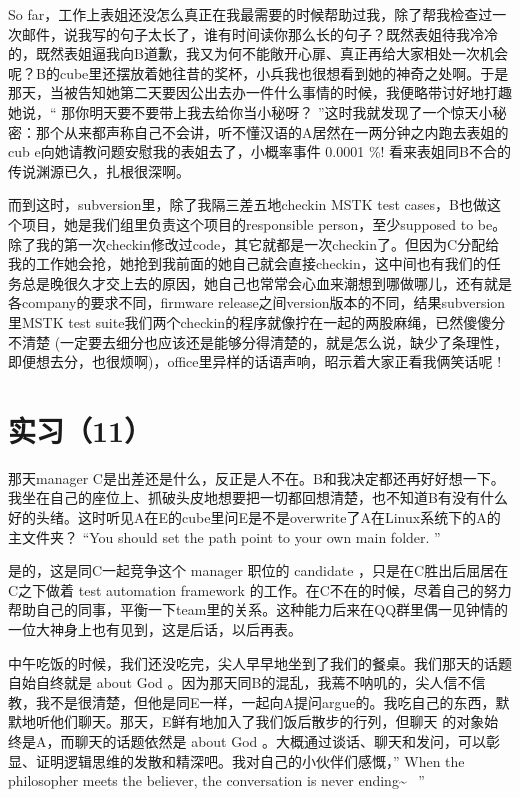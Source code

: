 \documentclass[12pt]{book}
\begin{document}
So far，工作上表姐还没怎么真正在我最需要的时候帮助过我，除了帮我检查过一次邮件，说我写的句子太长了，谁有时间读你那么长的句子？既然表姐待我冷冷的，既然表姐逼我向B道歉，我又为何不能敞开心扉、真正再给大家相处一次机会呢？B的cube里还摆放着她往昔的奖杯，小兵我也很想看到她的神奇之处啊。于是那天，当被告知她第二天要因公出去办一件什么事情的时候，我便略带讨好地打趣她说，“ 那你明天要不要带上我去给你当小秘呀？ ”这时我就发现了一个惊天小秘密：那个从来都声称自己不会讲，听不懂汉语的A居然在一两分钟之内跑去表姐的cub e向她请教问题安慰我的表姐去了，小概率事件 0.0001 \%! 看来表姐同B不合的传说渊源已久，扎根很深啊。

而到这时，subversion里，除了我隔三差五地checkin MSTK test cases，B也做这个项目，她是我们组里负责这个项目的responsible person，至少supposed to be。除了我的第一次checkin修改过code，其它就都是一次checkin了。但因为C分配给我的工作她会抢，她抢到我前面的她自己就会直接checkin，这中间也有我们的任务总是晚很久才交上去的原因，她自己也常常会心血来潮想到哪做哪儿，还有就是各company的要求不同，firmware release之间version版本的不同，结果subversion里MSTK test suite我们两个checkin的程序就像拧在一起的两股麻绳，已然傻傻分不清楚 (一定要去细分也应该还是能够分得清楚的，就是怎么说，缺少了条理性，即便想去分，也很烦啊)，office里异样的话语声响，昭示着大家正看我俩笑话呢 !

\section{实习（11）}
\label{sec-5-14}
那天manager C是出差还是什么，反正是人不在。B和我决定都还再好好想一下。我坐在自己的座位上、抓破头皮地想要把一切都回想清楚，也不知道B有没有什么好的头绪。这时听见A在E的cube里问E是不是overwrite了A在Linux系统下的A的主文件夹？ “You should set the path point to your own main folder. ”

是的，这是同C一起竞争这个 manager 职位的 candidate ，只是在C胜出后屈居在C之下做着 test automation framework 的工作。在C不在的时候，尽着自己的努力帮助自己的同事，平衡一下team里的关系。这种能力后来在QQ群里偶一见钟情的一位大神身上也有见到，这是后话，以后再表。

中午吃饭的时候，我们还没吃完，尖人早早地坐到了我们的餐桌。我们那天的话题自始自终就是 about God 。因为那天同B的混乱，我蔫不呐叽的，尖人信不信教，我不是很清楚，但他是同E一样，一起向A提问argue的。我吃自己的东西，默默地听他们聊天。那天，E鲜有地加入了我们饭后散步的行列，但聊天 的对象始终是A，而聊天的话题依然是 about God 。大概通过谈话、聊天和发问，可以彰显、证明逻辑思维的发散和精深吧。我对自己的小伙伴们感慨，” When the philosopher meets the believer,  the conversation is never ending\textasciitilde{}~ ”
\end{document}
